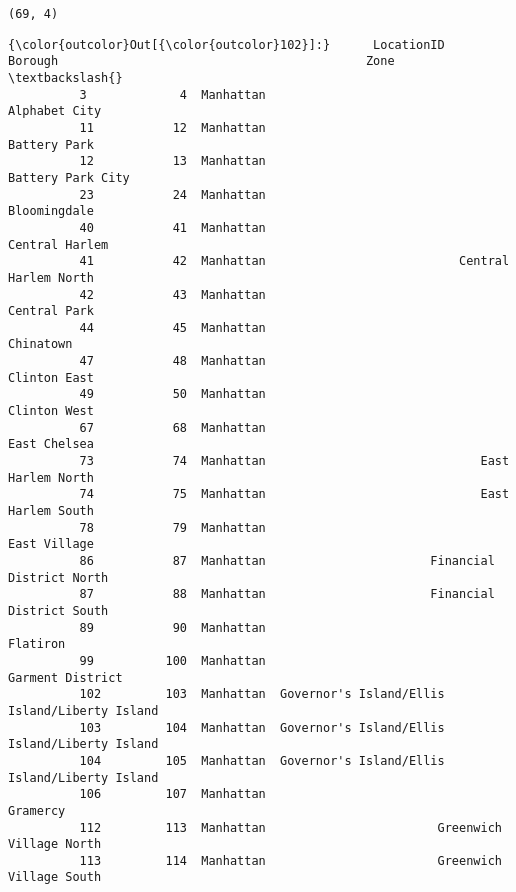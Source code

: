 \documentclass[11pt]{article}
\begin{document}
    \begin{Verbatim}[commandchars=\\\{\}]
(69, 4)

    \end{Verbatim}

\begin{Verbatim}[commandchars=\\\{\}]
{\color{outcolor}Out[{\color{outcolor}102}]:}      LocationID    Borough                                           Zone  \textbackslash{}
          3             4  Manhattan                                  Alphabet City   
          11           12  Manhattan                                   Battery Park   
          12           13  Manhattan                              Battery Park City   
          23           24  Manhattan                                   Bloomingdale   
          40           41  Manhattan                                 Central Harlem   
          41           42  Manhattan                           Central Harlem North   
          42           43  Manhattan                                   Central Park   
          44           45  Manhattan                                      Chinatown   
          47           48  Manhattan                                   Clinton East   
          49           50  Manhattan                                   Clinton West   
          67           68  Manhattan                                   East Chelsea   
          73           74  Manhattan                              East Harlem North   
          74           75  Manhattan                              East Harlem South   
          78           79  Manhattan                                   East Village   
          86           87  Manhattan                       Financial District North   
          87           88  Manhattan                       Financial District South   
          89           90  Manhattan                                       Flatiron   
          99          100  Manhattan                               Garment District   
          102         103  Manhattan  Governor's Island/Ellis Island/Liberty Island   
          103         104  Manhattan  Governor's Island/Ellis Island/Liberty Island   
          104         105  Manhattan  Governor's Island/Ellis Island/Liberty Island   
          106         107  Manhattan                                       Gramercy   
          112         113  Manhattan                        Greenwich Village North   
          113         114  Manhattan                        Greenwich Village South   

\end{Verbatim}
\end{document}
